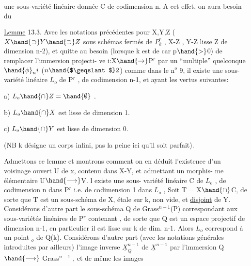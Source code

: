 
une sous-variété linéaire donnée C  de codimension n.  A cet effet,
on aura besoin du

\uline{Lemme} 13.3.  Avec les notations précédentes pour  X,Y,Z  ($X\hand{\supset} Y\hand{\supset} Z$
sous schémas fermés de $P^r_k$ , X-Z\hand{,} ,
Y-Z lisse \hand{,} Z de dimension \hand{$\leqslant$}n-2), et quitte
au besoin (lorsque k est de car p$\hand{>}$0)  de remplacer l'immersion projecti-%
ve  i:X$\hand{\rightarrow}$P$^r$  par  un ``multiple'' quelconque $\hand{\phi}_n i$ ($n \hand{$\geqslant$} 2$)  comme dans le
n$^o$ 9,  il existe une sous-variété linéaire  $L_o$ de P$^r$ , de codimension
n-1, et ayant les vertus suivantes:

a)  $L_o \hand{\cap} Z = \hand{\emptyset}$ .

b)  $L_o \hand{\cap} X$  est lisse de dimension 1.

c)  $L_o \hand{\cap} Y$   est lisse de dimension  0.

(NB  k désigne un corps infini, pas la peine ici qu'il soit parfait).

Admettons  ce lemme  et montrons comment on en déduit  l'existence
d'un voisinage ouvert U de x, contenu dans X-Y, et admettant un morphis-%
me élémentaire U$\hand{\longrightarrow}$V.  
 l existe une sous-%
variété linéaire C de $L_o$ , de codimension n dans P$^r$ i.e. de codimension
1 dans $L_o$ ,  
   
 Soit  T = X$\hand{\cap}$C, de sorte que T est un sous-schéma de X,
étale sur k, non vide, et \uline{disjoint} de Y.  Considérons d'autre part le
sous-schéma Q de Grass$^{n-1}$(P) correspondant aux sous-variétés linéaires
de P$^r$ contenant , de sorte que  Q est un  espace projectif
de dimension n-1,   en particulier il est lisse sur k de dim. n-1.
Alors $L_o$ correspond à un point \hand{$\xi$}$_o$ de Q(k).  Considérons d'autre part
(avec les notations générales introduites par ailleurs)  l'image inverse
$\underline{X}^{n-1}_Q$ de $\underline{X}^{n-1}$  par  l'immersion Q$\hand{\longrightarrow}$ Grass$^{n-1}$ , et de même les images

